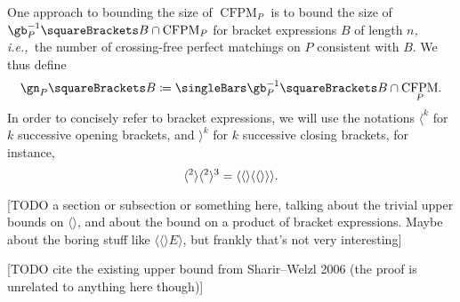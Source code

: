 \documentclass[10pt, a4paper, twoside]{basestyle}
\newcommand{\idest}{\emph{, i.e.,\ }}
\DeclareMathOperator{\CFPM}{CFPM}
\begin{document}
One approach to bounding the size of $\CFPM_P$ is to bound the size of
$\gb_P^{-1}\of{B}\Intersection \CFPM_P$ for bracket expressions $B$ of length $n$\idest the
number of crossing-free perfect matchings on $P$ consistent with $B$. We thus define
\[\gn_P\of B \DefineAs \Cardinality{\gb_P^{-1}\of{B}\Intersection \CFPM_P}\text.\]
In order to concisely refer to bracket expressions, we will use the notations
$\langle^k$ for $k$ successive opening brackets, and $\rangle^k$ for $k$ successive
closing brackets, for instance,\[
\langle^2\rangle\langle^2\rangle^3 = \langle\langle\rangle\langle\langle\rangle\rangle\rangle
\text.\]

[TODO a section or subsection or something here, talking about the trivial upper bounds on $\langle\rangle$,
and about the bound on a product of bracket expressions. Maybe about the boring stuff like
$\langle\langle\rangle E \rangle$, but frankly that's not very interesting]

[TODO cite the existing upper bound from Sharir--Welzl 2006 (the proof is unrelated to anything here
though)]
\end{document}
